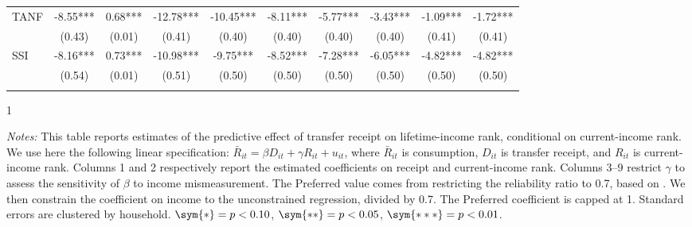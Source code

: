 \begin{table}[]
\begin{tabular*}{1.36\textwidth}{@{\extracolsep{\fill}}lccccccccc}
TANF               & -8.55***        & 0.68***        & -12.78***        & -10.45***        & -8.11***        & -5.77***        & -3.43***        & -1.09***        & -1.72*** \\
                   & (0.43)            & (0.01)            & (0.41)            & (0.40)            & (0.40)            & (0.40)            & (0.40)            & (0.41)            & (0.41)     \\
\addlinespace
SSI                & -8.16***         & 0.73***         & -10.98***         & -9.75***         & -8.52***         & -7.28***         & -6.05***         & -4.82***         & -4.82*** \\
                   & (0.54)             & (0.01)             & (0.51)             & (0.50)             & (0.50)             & (0.50)             & (0.50)             & (0.50)             & (0.50)     \\
\addlinespace
\bottomrule 
\end{tabular*}
\begin{spacing}{1}
    \begin{tablenotes}
          \item \footnotesize \textit{Notes:} This table reports estimates of the predictive effect of transfer receipt on lifetime-income rank, conditional on current-income rank. We use here the following linear specification: $\bar{R}_{it} =\beta D_{it} + \gamma R_{it} + u_{it}$, where $\bar{R}_{it}$ is consumption, $D_{it}$ is transfer receipt, and $R_{it}$ is current-income rank. Columns 1 and 2 respectively report the estimated coefficients on receipt and current-income rank. Columns 3--9
  restrict $\gamma$ to assess the
  sensitivity of $\beta$ to income mismeasurement. The Preferred value
  comes from restricting the reliability ratio to 0.7, based on \citet{abowd2013estimating}. We then
  constrain the coefficient on income to the unconstrained regression,
  divided by 0.7. The Preferred coefficient is capped at 1.  Standard errors are clustered by household.  $\sym{*} = p < 0.10$, $\sym{**} = p < 0.05$, $\sym{***} = p < 0.01$.       \end{tablenotes}
           \end{spacing}
\end{table}
